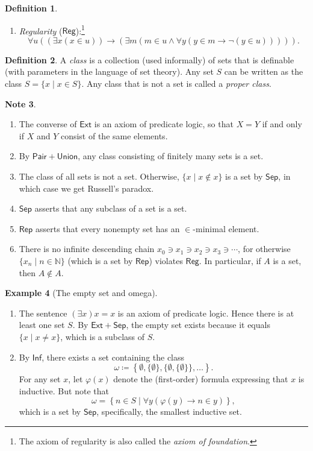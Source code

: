 \documentclass[10pt,letterpaper,cm]{nupset}
\theoremstyle{definition}
\newtheorem{definition}{Definition}[subsection]
\newtheorem{exmp}[definition]{Example}
\newtheorem{note}[definition]{Note}
\theoremstyle{theorem}
\theoremstyle{remark}
\newcommand{\N}{\mathbb N}
\newcommand{\1}{\mathbf{1}}
\newcommand{\0}{\vec 0}
\DeclareMathOperator{\im}{im}
\DeclareMathOperator{\dom}{dom}
\begin{document}
\begin{definition}
\begin{enumerate}
\[\] for each formula $\varphi(x, y, p_1, \ldots, p_n)$.
This asserts that if the class $F$ is a function and $\dom{F}$ is a set, then $\im{F}$ is also a set. 
\item \textit{Regularity}  ($\mathsf{Reg}$):\footnote{The axiom of regularity is also called the \textit{axiom of foundation}. }
\[
\forall u ((\exists x (x\in u)) \rightarrow (\exists m(m\in u \land \forall y(y\in m \rightarrow \neg(y \in u))))).
\]
\end{enumerate}
\end{definition}
 
\begin{definition}
 A \textit{class} is a collection (used informally) of sets that is definable (with parameters in the language of set theory).  Any set $S$ can be written as the class $S = \{x \mid x \in S\}$. Any class that is not a set is called a \textit{proper class}.
\end{definition} 
 
 \begin{note} $ $
\begin{enumerate}
\item The converse of $\mathsf{Ext}$ is an axiom of predicate logic, so that $X= Y$ if and only if $X$ and $Y$ consist of the same elements.
\item By $\mathsf{Pair} + \mathsf{Union}$, any class consisting of finitely many sets is a set.
\item The class of all sets is not a set. Otherwise, $\{x \mid x \notin x\}$ is a set by $\mathsf{Sep}$, in which case we get Russell's paradox. 
\item $\mathsf{Sep}$ asserts that any subclass of a set is a set.
\item $\mathsf{Rep}$ asserts that every nonempty set has an $\in$-minimal element.
\item There is no infinite descending chain $x_0 \ni x_1 \ni x_2 \ni x_3 \ni \cdots $, for otherwise $\{x_n \mid n \in \N\}$ (which is a set by $\mathsf{Rep}$) violates $\mathsf{Reg}$. In particular, if $A$ is a set, then $A\notin A$.
\end{enumerate} 
\end{note}
 
\begin{exmp}[The empty set and omega] $ $
\begin{enumerate} 
\item The sentence ${(\exists x)x=x}$ is an axiom of predicate logic. Hence there is at least one set $S$. By $\mathsf{Ext} +\mathsf{Sep}$, the empty set exists because it equals $\{x \mid x \ne x\}$, which is a subclass of $S$. 
\item By $\mathsf{Inf}$, there exists a set containing the class $$\omega  \coloneqq \left\{\emptyset, \{\emptyset\},  \{ \emptyset, \{\emptyset\}\}, \ldots \right\}.$$ For any set $x$, let $\varphi(x)$ denote the (first-order) formula expressing that $x$ is inductive. But note that $$\omega = \left\{n \in S \mid \forall y(\varphi(y)\rightarrow n \in y)  \right\},$$ which is a set by $\mathsf{Sep}$, specifically, the smallest inductive set.
\end{enumerate}
\end{exmp} 
 
\end{document}
